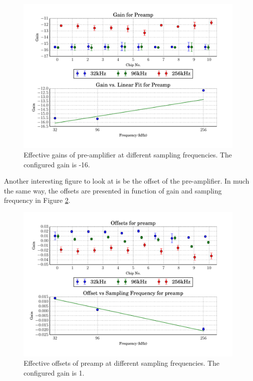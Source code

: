 \begin{figure}
    \centering
    \includegraphics[width=0.95\linewidth]{images/plots/dc_slope_preamp_gain-16.pdf}
    \caption{Effective gains of pre-amplifier at different sampling frequencies. The configured gain is -16.}
    \label{fig:preamp_slope-16}
\end{figure}

Another   interesting  figure   to  look   at  is   be  the   offset  of   the
pre-amplifier. In much the same way, the  offsets are presented in function of
gain and sampling frequency in Figure \ref{fig:preamp_offsets}.

\begin{figure}
    \centering
    \includegraphics[width=0.95\linewidth]{images/plots/dc_offsets_preamp.pdf}
    \caption{Effective offsets of preamp at different sampling frequencies. The configured gain is 1.}
    \label{fig:preamp_offsets}
\end{figure}

